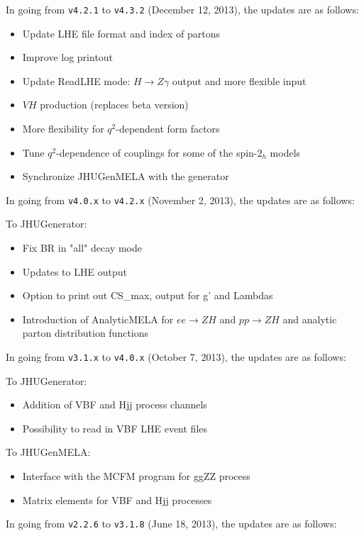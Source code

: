 \documentclass[aps,superscriptaddress,nofootinbib]{revtex4}
\begin{document}
\noindent
In going from \verb|v4.2.1| to \verb|v4.3.2| (December 12, 2013), the updates are as follows:

\begin{itemize}
\item Update LHE file format and index of partons
\item Improve log printout
\item Update ReadLHE mode: $H\to Z\gamma$ output and more flexible input
\item $VH$ production (replaces beta version)
\item More flexibility for $q^2$-dependent form factors
\item Tune $q^2$-dependence of couplings for some of the spin-$2_h$ models
\item Synchronize JHUGenMELA with the generator
\end{itemize}

\noindent
In going from \verb|v4.0.x| to \verb|v4.2.x| (November 2, 2013), the updates are as follows:

To JHUGenerator:
\begin{itemize}
\item Fix BR in "all" decay mode
\item Updates to LHE output
\item Option to print out CS\_max, output for g' and Lambdas
\item Introduction of AnalyticMELA for $ee \to ZH$ and $pp \to ZH$ and analytic parton distribution functions
\end{itemize}


\noindent
In going from \verb|v3.1.x| to \verb|v4.0.x| (October 7, 2013), the updates are as follows:

To JHUGenerator:
\begin{itemize}
\item Addition of VBF and Hjj process channels
\item Possibility to read in VBF LHE event files
\end{itemize}

To JHUGenMELA:
\begin{itemize}
\item Interface with the MCFM program for ggZZ process
\item Matrix elements for VBF and Hjj processes
\end{itemize}


\noindent
In going from \verb|v2.2.6| to \verb|v3.1.8| (June 18, 2013), the updates are as follows:
\end{document}
